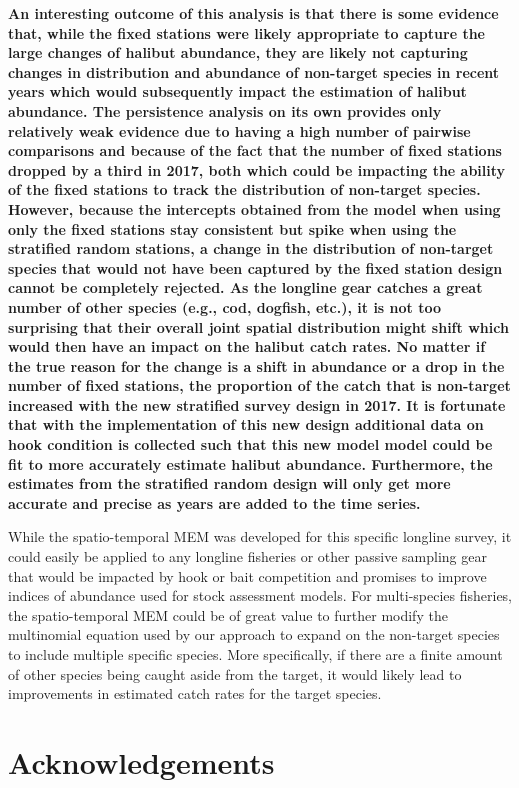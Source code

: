 \documentclass[12pt]{article}\usepackage[]{graphicx}\usepackage[]{color}
\begin{document}
\textbf{An interesting outcome of this analysis is that there is some evidence that, while the fixed stations were likely appropriate to capture the large changes of halibut abundance, they are likely not capturing changes in distribution and abundance of non-target species in recent years which would subsequently impact the estimation of halibut abundance. The persistence analysis on its own provides only relatively weak evidence due to having a high number of pairwise comparisons and because of the fact that the number of fixed stations dropped by a third in 2017, both which could be impacting the ability of the fixed stations to track the distribution of non-target species. However, because the intercepts obtained from the model when using only the fixed stations stay consistent but spike when using the stratified random stations, a change in the distribution of non-target species that would not have been captured by the fixed station design cannot be completely rejected. As the longline gear catches a great number of other species (e.g., cod, dogfish, etc.), it is not too surprising that their overall joint spatial distribution might shift which would then have an impact on the halibut catch rates. No matter if the true reason for the change is a shift in abundance or a drop in the number of fixed stations, the proportion of the catch that is non-target increased with the new stratified survey design in 2017. It is fortunate that with the implementation of this new design additional data on hook condition is collected such that this new model model could be fit to more accurately estimate halibut abundance. Furthermore, the estimates from the stratified random design will only get more accurate and precise as years are added to the time series.}

While the spatio-temporal MEM was developed for this specific longline survey, it could easily be applied to any longline fisheries or other passive sampling gear that would be impacted by hook or bait competition and promises to improve indices of abundance used for stock assessment models. For multi-species fisheries, the spatio-temporal MEM could be of great value to further modify the multinomial equation used by our approach to expand on the non-target species to include multiple specific species. More specifically, if there are a finite amount of other species being caught aside from the target, it would likely lead to improvements in estimated catch rates for the target species.

\hypertarget{acknowledgements}{%
\section{Acknowledgements}\label{acknowledgements}}
\end{document}
